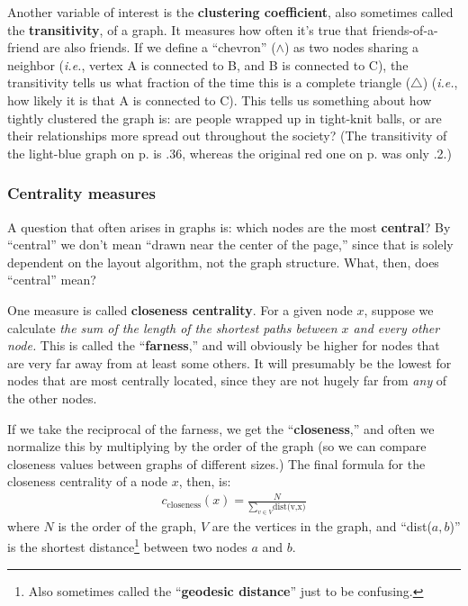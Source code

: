 
Another variable of interest is the \textbf{clustering coefficient}, also
sometimes called the \textbf{transitivity}, of a graph. It measures how often
it's true that friends-of-a-friend are also friends. If we define a ``chevron''
($\wedge$) as two nodes sharing a neighbor (\textit{i.e.}, vertex A is
connected to B, and B is connected to C), the transitivity tells us what
fraction of the time this is a complete triangle ($\triangle$) (\textit{i.e.},
how likely it is that A is connected to C). This tells us something about how
tightly clustered the graph is: are people wrapped up in tight-knit balls, or
are their relationships more spread out throughout the society? (The
transitivity of the light-blue graph on p.\pageref{lightblueGraph} is .36,
whereas the original red one on p.\pageref{first_example} was only .2.)

\subsubsection{Centrality measures}


A question that often arises in graphs is: which nodes are the most
\textbf{central}? By ``central'' we don't mean ``drawn near the center of the
page,'' since that is solely dependent on the layout algorithm, not the graph
structure. What, then, does ``central'' mean?

\bigskip
{}

One measure is called \textbf{closeness centrality}. For a given node $x$,
suppose we calculate \textit{the sum of the length of the shortest paths
between $x$ and every other node.} This is called the ``\textbf{farness},'' and
will obviously be higher for nodes that are very far away from at least some
others. It will presumably be the lowest for nodes that are most centrally
located, since they are not hugely far from \textit{any} of the other nodes.


If we take the reciprocal of the farness, we get the ``\textbf{closeness},''
and often we normalize this by multiplying by the order of the graph (so we
can compare closeness values between graphs of different sizes.) The final
formula for the closeness centrality of a node $x$, then, is:
\begin{align*}
c_{\textrm{closeness}}(x) = \frac{N}{\sum_{v \in V} \textrm{dist(v,x)}}
\end{align*}
where $N$ is the order of the graph, $V$ are the vertices in the graph, and
``dist($a,b$)'' is the shortest distance\footnote{Also sometimes called the
``\textbf{geodesic distance}'' just to be confusing.} between two nodes $a$ and $b$.

